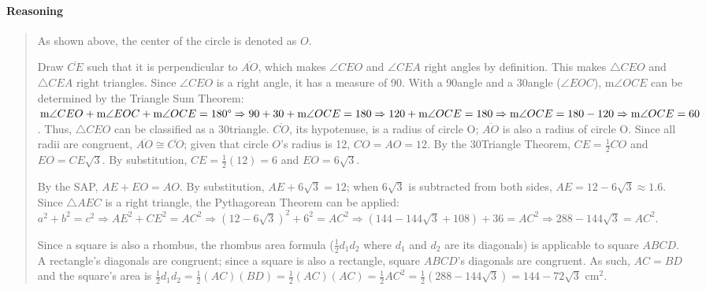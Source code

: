 \documentclass[letterpaper,12pt,twoside]{report}
\begin{document}
	\paragraph{Reasoning}
	\begin{quotation}
		
		As shown above, the center of the circle is denoted as $O$.
		
		Draw $\overline{CE}$ such that it is perpendicular to $\overline{AO}$, which makes $\angle CEO$ and $\angle CEA$ right angles by definition. This makes $\triangle CEO$ and $\triangle CEA$ right triangles. Since $\angle CEO$ is a right angle, it has a measure of 90\textdegree. With a 90\textdegree   \space angle and a 30\textdegree \space angle ($\angle EOC$), m$\angle OCE$ can be determined by the Triangle Sum Theorem: $\text{m}\angle CEO+\text{m}\angle EOC+\text{m}\angle OCE=180\text{\textdegree} \Rightarrow 90+30+\text{m}\angle OCE=180 \Rightarrow 120+\text{m}\angle OCE=180 \Rightarrow \text{m}\angle OCE=180-120 \Rightarrow \text{m}\angle OCE=60$\textdegree. Thus, $\triangle CEO$ can be classified as a 30\textdegree \space triangle. $\overline{CO}$, its hypotenuse, is a radius of circle O; $\overline{AO}$ is also a radius of circle O. Since all radii are congruent, $\overline{AO}\cong\overline{CO}$; given that circle $O$'s radius is 12, $CO=AO=12$. By the 30\textdegree \space Triangle Theorem, $CE=\frac{1}{2}CO$ and $EO=CE\sqrt{3}$. By substitution, $CE=\frac{1}{2}(12)=6$ and $EO=6\sqrt{3}$.
		
		By the SAP, $AE+EO=AO$. By substitution, $AE+6\sqrt{3}=12$; when $6\sqrt{3}$ is subtracted from both sides, $AE=12-6\sqrt{3}\approx 1.6$. Since $\triangle AEC$ is a right triangle, the Pythagorean Theorem can be applied: $a^2+b^2=c^2 \Rightarrow AE^2+CE^2=AC^2 \Rightarrow (12-6\sqrt{3})^2+6^2=AC^2 \Rightarrow (144-144\sqrt{3}+108)+36=AC^2 \Rightarrow 288-144\sqrt{3}=AC^2$.
		
		Since a square is also a rhombus, the rhombus area formula ($\frac{1}{2}d_1 d_2$ where $d_1$ and $d_2$ are its diagonals) is applicable to square $ABCD$. A rectangle's diagonals are congruent; since a square is also a rectangle, square $ABCD$'s diagonals are congruent. As such, $AC=BD$ and the square's area is $\frac{1}{2}d_1 d_2=\frac{1}{2}(AC)(BD)=\frac{1}{2}(AC)(AC)=\frac{1}{2}AC^2=\frac{1}{2}(288-144\sqrt{3})=\boxed{144-72\sqrt{3}\text{  cm}^2}$.
			
\end{quotation}
	
	
\end{document}
